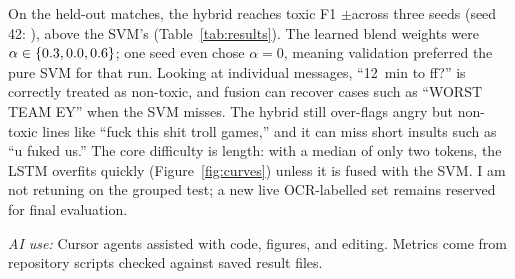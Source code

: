 On the held-out matches, the hybrid reaches toxic F1 \HybridFOne$\pm$\HybridFOneStd across three seeds (seed 42: \HybridSeedFortyTwoFOne), above the SVM's \BaselineFOne{} (Table~\ref{tab:results}). The learned blend weights were $\alpha\in\{0.3, 0.0, 0.6\}$; one seed even chose $\alpha=0$, meaning validation preferred the pure SVM for that run. Looking at individual messages, ``12~min to ff?'' is correctly treated as non-toxic, and fusion can recover cases such as ``WORST TEAM EY'' when the SVM misses. The hybrid still over-flags angry but non-toxic lines like ``fuck this shit troll games,'' and it can miss short insults such as ``u fuked us.'' The core difficulty is length: with a median of only two tokens, the LSTM overfits quickly (Figure~\ref{fig:curves}) unless it is fused with the SVM. I am not retuning on the grouped test; a new live OCR-labelled set remains reserved for final evaluation.

{\small\noindent\textit{AI use:} Cursor agents assisted with code, figures, and editing. Metrics come from repository scripts checked against saved result files.}

\clearpage




